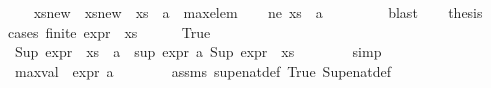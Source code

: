 \begin{isabellebody}
\ \ \isamarkupfalse%
\ xs{\isacharunderscore}{\kern0pt}new\ \ {\isachardoublequoteopen}xs{\isacharunderscore}{\kern0pt}new\ {\isacharequal}{\kern0pt}\ {\isacharparenleft}{\kern0pt}xs\ {\isasymunion}\ {\isacharbraceleft}{\kern0pt}a{\isacharbraceright}{\kern0pt}{\isacharparenright}{\kern0pt}\ {\isacharminus}{\kern0pt}\ {\isacharbraceleft}{\kern0pt}max{\isacharunderscore}{\kern0pt}elem{\isacharbraceright}{\kern0pt}{\isachardoublequoteclose}\isanewline
\ \ \isamarkupfalse%
\ ne{\isacharcolon}{\kern0pt}\ {\isachardoublequoteopen}{\isacharparenleft}{\kern0pt}xs\ {\isasymunion}\ {\isacharbraceleft}{\kern0pt}a{\isacharbraceright}{\kern0pt}{\isacharparenright}{\kern0pt}\ {\isasymnoteq}\ {\isacharbraceleft}{\kern0pt}{\isacharbraceright}{\kern0pt}{\isachardoublequoteclose}\ \isanewline
\ \ \ \ \isamarkupfalse%
\ blast\isanewline
\ \ \isamarkupfalse%
\ {\isacharquery}{\kern0pt}thesis\isanewline
\ \ \isamarkupfalse%
{\isacharparenleft}{\kern0pt}cases\ {\isachardoublequoteopen}finite\ {\isacharparenleft}{\kern0pt}expr{\isacharunderscore}{\kern0pt}{}\ {\isacharbackquote}{\kern0pt}\ xs{\isacharparenright}{\kern0pt}{\isachardoublequoteclose}{\isacharparenright}{\kern0pt}\isanewline
\ \ \ \ \isamarkupfalse%
\ True\isanewline
\ \ \ \ \isamarkupfalse%
\ {\isachardoublequoteopen}Sup\ {\isacharparenleft}{\kern0pt}expr{\isacharunderscore}{\kern0pt}{}\ {\isacharbackquote}{\kern0pt}\ {\isacharparenleft}{\kern0pt}xs\ {\isasymunion}\ {\isacharbraceleft}{\kern0pt}a{\isacharbraceright}{\kern0pt}{\isacharparenright}{\kern0pt}{\isacharparenright}{\kern0pt}\ {\isacharequal}{\kern0pt}\ {\isacharparenleft}{\kern0pt}sup\ {\isacharparenleft}{\kern0pt}expr{\isacharunderscore}{\kern0pt}{}\ a{\isacharparenright}{\kern0pt}\ {\isacharparenleft}{\kern0pt}Sup\ {\isacharparenleft}{\kern0pt}expr{\isacharunderscore}{\kern0pt}{}\ {\isacharbackquote}{\kern0pt}\ xs{\isacharparenright}{\kern0pt}{\isacharparenright}{\kern0pt}{\isacharparenright}{\kern0pt}{\isachardoublequoteclose}\isanewline
\ \ \ \ \ \ \isamarkupfalse%
\ simp\isanewline
\ \ \ \ \isamarkupfalse%
\ {\isachardoublequoteopen}max{\isacharunderscore}{\kern0pt}val\ {\isacharequal}{\kern0pt}\ expr{\isacharunderscore}{\kern0pt}{}\ a{\isachardoublequoteclose}\isanewline
\ \ \ \ \ \ \isamarkupfalse%
\ assms\ sup{\isacharunderscore}{\kern0pt}enat{\isacharunderscore}{\kern0pt}def\ True\ Sup{\isacharunderscore}{\kern0pt}enat{\isacharunderscore}{\kern0pt}def\isanewline

\end{isabellebody}
